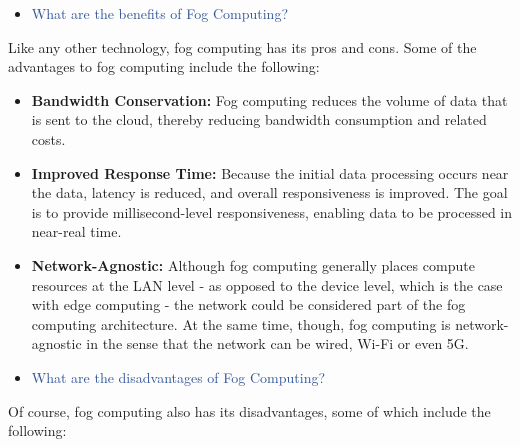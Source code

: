 \documentclass[11pt]{article}
\begin{document}
\newpage

\vspace{1\baselineskip}
\begin{itemize}
\item {\Large \textcolor[HTML]{2F5496}{What are the benefits of Fog Computing?}}
\end{itemize}

Like any other technology, fog computing has its pros and cons. Some of the advantages to fog computing include the following:

\begin{itemize}
\item \textbf{Bandwidth Conservation:} Fog computing reduces the volume of data that is sent to the cloud, thereby reducing bandwidth consumption and related costs.

\item \textbf{Improved Response Time:} Because the initial data processing occurs near the data, latency is reduced, and overall responsiveness is improved. The goal is to provide millisecond-level responsiveness, enabling data to be processed in near-real time.

\item \textbf{Network-Agnostic:} Although fog computing generally places compute resources at the LAN level - as opposed to the device level, which is the case with edge computing - the network could be considered part of the fog computing architecture. At the same time, though, fog computing is network-agnostic in the sense that the network can be wired, Wi-Fi or even 5G.
\end{itemize}

\vspace{1\baselineskip}
\begin{itemize}
\item {\Large \textcolor[HTML]{2F5496}{What are the disadvantages of Fog Computing?}}
\end{itemize}

Of course, fog computing also has its disadvantages, some of which include the following:
\end{document}
